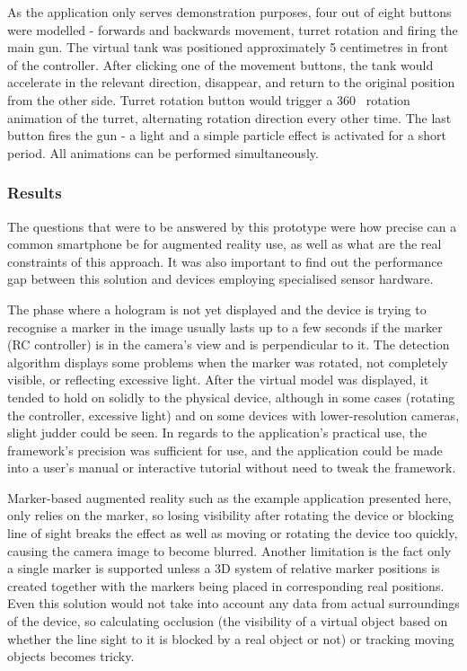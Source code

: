 \documentclass[12pt, a4paper]{article}
\begin{document}
As the application only serves demonstration purposes, four out of eight buttons were modelled - forwards and backwards movement, turret rotation and firing the main gun. The virtual tank was positioned approximately 5 centimetres in front of the controller. After clicking one of the movement buttons, the tank would accelerate in the relevant direction, disappear, and return to the original position from the other side. Turret rotation button would trigger a 360\degree~ rotation animation of the turret, alternating rotation direction every other time. The last button fires the gun - a light and a simple particle effect is activated for a short period. All animations can be performed simultaneously.


\subsubsection{Results}
The questions that were to be answered by this prototype were how precise can a common smartphone be for augmented reality use, as well as what are the real constraints of this approach. It was also important to find out the performance gap between this solution and devices employing specialised sensor hardware.

The phase where a hologram is not yet displayed and the device is trying to recognise a marker in the image usually lasts up to a few seconds if the marker (RC controller) is in the camera’s view and is perpendicular to it. The detection algorithm displays some problems when the marker was rotated, not completely visible, or reflecting excessive light. After the virtual model was displayed, it tended to hold on solidly to the physical device, although in some cases (rotating the controller, excessive light) and on some devices with lower-resolution cameras, slight judder could be seen. In regards to the application’s practical use, the framework’s precision was sufficient for use, and the application could be made into a user’s manual or interactive tutorial without need to tweak the framework.

Marker-based augmented reality such as the example application presented here, only relies on the marker, so losing visibility after rotating the device or blocking line of sight breaks the effect as well as moving or rotating the device too quickly, causing the camera image to become blurred. Another limitation is the fact only a single marker is supported unless a 3D system of relative marker positions is created together with the markers being placed in corresponding real positions. Even this solution would not take into account any data from actual surroundings of the device, so calculating occlusion (the visibility of a virtual object based on whether the line sight to it is blocked by a real object or not) or tracking moving objects becomes tricky.
\end{document}

